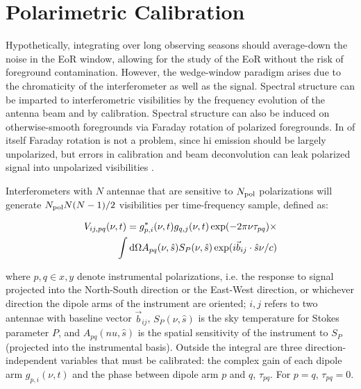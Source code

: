 \chapter{Polarimetric Calibration}
\label{chapter:polcal}

Hypothetically, integrating over long observing seasons should average-down the noise in the EoR window, allowing for the study of the EoR without the risk of foreground contamination. However, the wedge-window paradigm arises due to the chromaticity of the interferometer as well as the signal. Spectral structure can be imparted to interferometric visibilities by the frequency evolution of the antenna beam and by calibration. Spectral structure can also be induced on otherwise-smooth foregrounds via Faraday rotation of polarized foregrounds. In of itself Faraday rotation is not a problem, since {\sc hi} emission should be largely unpolarized, but errors in calibration and beam deconvolution can leak polarized signal into unpolarized visibilities \citep[e.g.][; Chapter~\ref{chapter:interferometry}]{TMS}.

Interferometers with $N$ antennae that are sensitive to $N_{\rm pol}$ polarizations will generate $N_{\rm pol}N(N-1)/2$ visibilities per time-frequency sample, defined as:

\begin{eqnarray}
V_{ij,pq}(\nu, t) = g^*_{p,i}(\nu,t) g_{q,j}(\nu,t) \exp(-2\pi\nu \tau_{pq}) \times \nonumber\\
\int {\rm d}\Omega A_{pq}(\nu, \hat{s}) S_{P}(\nu, \hat{s}) \exp(i \vec{b}_{ij}\cdot\hat{s} \nu/c)
\end{eqnarray}

where $p,q \in x,y$ denote instrumental polarizations, i.e. the response to signal projected into the North-South direction or the East-West direction, or whichever direction the dipole arms of the instrument are oriented; $i,j$ refers to two antennae with baseline vector $\vec{b}_{ij}$, $S_{P}(\nu, \hat{s})$ is the sky temperature for Stokes parameter $P$, and $A_{pq}(nu, \hat{s})$ is the spatial sensitivity of the instrument to $S_{P}$ (projected into the instrumental basis). Outside the integral are three direction-independent variables that must be calibrated: the complex gain of each dipole arm $g_{p,i}(\nu,t)$ and the phase between dipole arm $p$ and $q$, $\tau_{pq}$. For $p=q$, $\tau_{pq}=0$.

